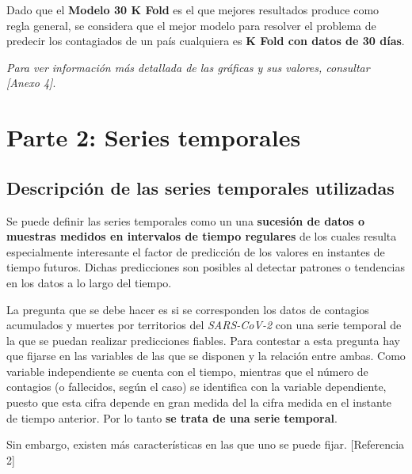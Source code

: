 \documentclass[12pt,a4paper, xcolor=table]{article}
\begin{document}
    \vspace{2mm}

    Dado que el \textbf{Modelo 30 K Fold} es el que mejores resultados produce como regla general, se considera que el mejor modelo para resolver el problema de predecir los contagiados de un país cualquiera es \textbf{K Fold con datos de 30 días}.

    \vspace{6mm}

    \textit{Para ver información más detallada de las gráficas y sus valores, consultar [Anexo 4]}.



    \newpage
    \section{Parte 2: Series temporales}

    \subsection{Descripción de las series temporales utilizadas}

        Se puede definir las series temporales como un una \textbf{sucesión de datos o muestras medidos en intervalos de tiempo regulares} de los cuales resulta especialmente interesante el factor de predicción de los valores en instantes de tiempo futuros. Dichas predicciones son posibles al detectar patrones o tendencias en los datos a lo largo del tiempo.

        \vspace{2mm}

        La pregunta que se debe hacer es si se corresponden los datos de contagios acumulados y muertes por territorios del  \textit{SARS-CoV-2} con una serie temporal de la que se puedan realizar predicciones fiables. Para contestar a esta pregunta hay que fijarse en las variables de las que se disponen y la relación entre ambas. Como variable independiente se cuenta con el tiempo, mientras que el número de contagios (o fallecidos, según el caso) se identifica con la variable dependiente, puesto que esta cifra depende en gran medida del la cifra medida en el instante de tiempo anterior. Por lo tanto \textbf{se trata de una serie temporal}.

        \vspace{2mm}

        Sin embargo, existen más características en las que uno se puede fijar. [Referencia 2]
\end{document}
